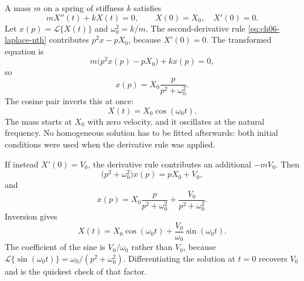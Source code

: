 \begin{example}
A mass $m$ on a spring of stiffness $k$ satisfies
\begin{equation}
mX''(t)+kX(t)=0,
\qquad X(0)=X_0,\quad X'(0)=0.
\end{equation}
Let $x(p)=\mathcal{L}\{X(t)\}$ and $\omega_0^2=k/m$. The second-derivative rule \eqref{eq:ch06-laplace-nth} contributes $p^2x-pX_0$, because $X'(0)=0$. The transformed equation is
\begin{equation}
m\bigl(p^2x(p)-pX_0\bigr)+kx(p)=0,
\end{equation}
so
\begin{equation}
x(p)=X_0\frac{p}{p^2+\omega_0^2}.
\end{equation}
The cosine pair inverts this at once:
\begin{equation}
X(t)=X_0\cos(\omega_0 t).
\end{equation}
The mass starts at $X_0$ with zero velocity, and it oscillates at the natural frequency. No homogeneous solution has to be fitted afterwards: both initial conditions were used when the derivative rule was applied.
\end{example}

\begin{example}
If instead $X'(0)=V_0$, the derivative rule contributes an additional $-mV_0$. Then
\begin{equation}
\bigl(p^2+\omega_0^2\bigr)x(p)=pX_0+V_0,
\end{equation}
and
\begin{equation}
x(p)=X_0\frac{p}{p^2+\omega_0^2}+\frac{V_0}{p^2+\omega_0^2}.
\end{equation}
Inversion gives
\begin{equation}
X(t)=X_0\cos(\omega_0 t)+\frac{V_0}{\omega_0}\sin(\omega_0 t).
\end{equation}
The coefficient of the sine is $V_0/\omega_0$ rather than $V_0$, because $\mathcal{L}\{\sin(\omega_0 t)\}=\omega_0/(p^2+\omega_0^2)$. Differentiating the solution at $t=0$ recovers $V_0$ and is the quickest check of that factor.
\end{example}
